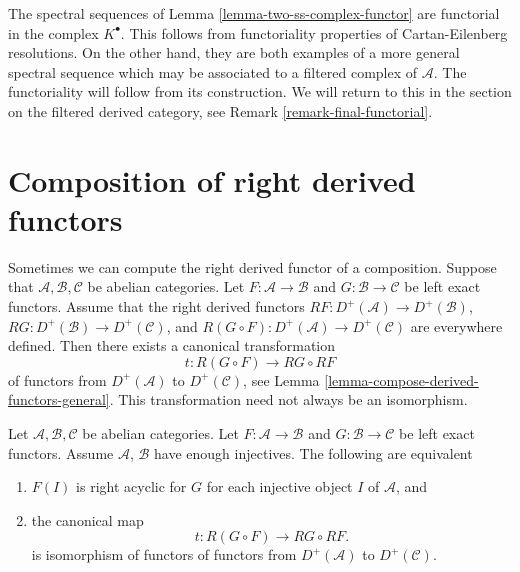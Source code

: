 \begin{remark}
\label{remark-functorial-ss}
The spectral sequences of Lemma \ref{lemma-two-ss-complex-functor}
are functorial in the complex $K^\bullet$. This follows from functoriality
properties of Cartan-Eilenberg resolutions. On the other hand, they are
both examples of a more general spectral sequence which may be associated
to a filtered complex of $\mathcal{A}$. The functoriality will follow from
its construction. We will return to this in the section on the filtered
derived category, see Remark \ref{remark-final-functorial}.
\end{remark}










\section{Composition of right derived functors}
\label{section-composition-right-derived-functors}

\noindent
Sometimes we can compute the right derived functor of a composition.
Suppose that $\mathcal{A}, \mathcal{B}, \mathcal{C}$ be abelian categories.
Let $F : \mathcal{A} \to \mathcal{B}$ and $G : \mathcal{B} \to \mathcal{C}$
be left exact functors. Assume that the right derived functors
$RF : D^{+}(\mathcal{A}) \to D^{+}(\mathcal{B})$,
$RG : D^{+}(\mathcal{B}) \to D^{+}(\mathcal{C})$, and
$R(G \circ F) : D^{+}(\mathcal{A}) \to D^{+}(\mathcal{C})$
are everywhere defined. Then there exists a canonical transformation
$$
t : R(G \circ F) \longrightarrow RG \circ RF
$$
of functors from $D^{+}(\mathcal{A})$ to $D^{+}(\mathcal{C})$, see
Lemma \ref{lemma-compose-derived-functors-general}.
This transformation need not always be an isomorphism.

\begin{lemma}
\label{lemma-compose-derived-functors}
Let $\mathcal{A}, \mathcal{B}, \mathcal{C}$ be abelian categories.
Let $F : \mathcal{A} \to \mathcal{B}$ and $G : \mathcal{B} \to \mathcal{C}$
be left exact functors. Assume $\mathcal{A}$, $\mathcal{B}$ have
enough injectives. The following are equivalent
\begin{enumerate}
\item $F(I)$ is right acyclic for $G$ for each injective object $I$
of $\mathcal{A}$, and
\item the canonical map
$$
t : R(G \circ F) \longrightarrow RG \circ RF.
$$
is isomorphism of functors of functors from
$D^{+}(\mathcal{A})$ to $D^{+}(\mathcal{C})$.
\end{enumerate}
\end{lemma}

